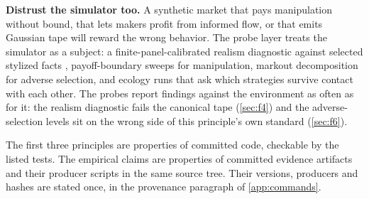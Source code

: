 \textbf{Distrust the simulator too.} A synthetic market that pays manipulation without bound, that lets makers profit from informed flow, or that emits Gaussian tape will reward the wrong behavior. The probe layer treats the simulator as a subject: a finite-panel-calibrated realism diagnostic against selected stylized facts \citep{cont2001empirical}, payoff-boundary sweeps for manipulation, markout decomposition for adverse selection, and ecology runs that ask which strategies survive contact with each other. The probes report findings against the environment as often as for it: the realism diagnostic fails the canonical tape (\cref{sec:f4}) and the adverse-selection levels sit on the wrong side of this principle's own standard (\cref{sec:f6}).

The first three principles are properties of committed code, checkable by the listed tests. The empirical claims are properties of committed evidence artifacts and their producer scripts in the same source tree. Their versions, producers and hashes are stated once, in the provenance paragraph of \cref{app:commands}.
